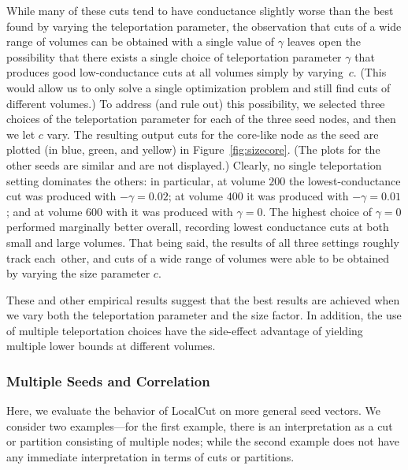 \documentclass[11pt]{article}
\begin{document}
While many of these cuts tend to have conductance slightly worse than the 
best found by varying the teleportation parameter, the observation that cuts 
of a wide range of volumes can be obtained with a single value of $\gamma$ 
leaves open the possibility that there exists a single choice of 
teleportation parameter $\gamma$ that produces good low-conductance cuts at 
all volumes simply by varying~$c$. 
(This would allow us to only solve a single optimization problem and still 
find cuts of different volumes.)
To address (and rule out) this possibility, we selected three choices of 
the teleportation parameter for each of the three seed nodes, and then we 
let $c$ vary. 
The resulting output cuts for the core-like node as the seed are plotted 
(in blue, green, and yellow) in Figure~\ref{fig:sizecore}. 
(The plots for the other seeds are similar and are not displayed.)
Clearly, no single teleportation setting dominates the others: in 
particular, at volume $200$ the lowest-conductance cut was produced with 
$-\gamma=0.02$; at volume $400$ it was produced with $-\gamma=0.01$; and at 
volume $600$ with it was produced with $\gamma=0$. 
The highest choice of $\gamma=0$ performed marginally better overall, 
recording lowest conductance cuts at both small and large volumes. 
That being said, the results of all three settings roughly track each~other, 
and cuts of a wide range of volumes were able to be obtained by varying the 
size parameter $c$.

These and other empirical results suggest that the best results are 
achieved when we vary both the teleportation parameter and the size factor. 
In addition, the use of multiple teleportation choices have the side-effect 
advantage of yielding multiple lower bounds at different volumes.


\subsubsection{Multiple Seeds and Correlation}
\label{sec:multi}

Here, we evaluate the behavior of \textsf{LocalCut} on more general seed 
vectors. 
We consider two examples---for the first example, there is an interpretation 
as a cut or partition consisting of multiple nodes; while the second example 
does not have any immediate interpretation in terms of cuts or partitions.
\end{document}
